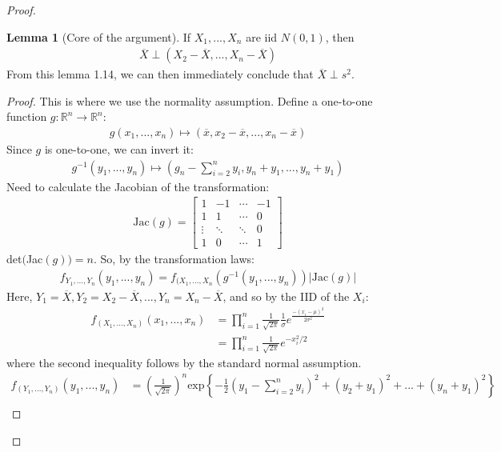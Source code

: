 \documentclass[11pt]{scrartcl}
\newcommand{\R}[0]{\mathbb{R}}
\theoremstyle{definition}
\newtheorem{lemma}[theorem]{Lemma}
\theoremstyle{remark}
\begin{document}
\begin{proof}
	\begin{lemma}[Core of the argument] If $X_1, ..., X_n$ are iid $N(0,1)$, then
	\begin{align}
		\overline{X} \perp (X_2 - \overline{X}, ..., X_n - \overline{X}) 
	\end{align}
	From this lemma 1.14, we can then immediately conclude that $\overline{X} \perp s^2$. 
	\end{lemma}
	\begin{proof} This is where we use the normality assumption. Define a one-to-one function $g: \R^n \rightarrow \R^n$: 
	\begin{align*}
		g(x_1, ..., x_n ) \mapsto (\overline{x}, x_2 - \overline{x}, ..., x_n - \overline{x})	
	\end{align*}
	Since $g$ is one-to-one, we can invert it: 
	\begin{align*}
	g^{-1}(y_1, ..., y_n) \mapsto \left(g_n - \sum_{i=2}^n y_i, y_n + y_1, ..., y_n + y_1  \right) 	
	\end{align*}
	Need to calculate the Jacobian  of the transformation: 
	\begin{align*}
		\text{Jac}(g) = \begin{bmatrix}
			1 & -1 & \cdots & -1 \\
			1 & 1  & \cdots & 0 \\
			\vdots & \ddots & \ddots & 0 \\
			1 & 0 & \cdots & 1 
		\end{bmatrix}	
	\end{align*}
	det$($Jac$(g)) = n$. So, by the transformation laws: 
	\begin{align*}
		f_{Y_1, ..., Y_n} (y_1 , ..., y_n) 	= f_{(X_1, ..., X_n} (g^{-1}(y_1, ..., y_n ) ) |\text{Jac}(g)|
	\end{align*}
	Here, $Y_1 = \overline{X}, Y_2= X_2 - \overline{X}, ..., Y_n  = X_n - \overline{X}$, and so by the IID of the $X_i$: 
	\begin{align*}
		f_{(X_1, ..., X_n)} (x_1, ..., x_n) & = \prod_{i=1}^n \frac{1}{\sqrt{2 \pi}}	 \frac{1}{\sigma} e^{\frac{-(x_i - \mu)^2}{2 \sigma^2}} \\	
		& = \prod_{i=1}^n \frac{1}{\sqrt{ 2 \pi}} e^{-x_i^2 / 2 } 		
	\end{align*}
	where the second inequality follows by the standard normal assumption. 
	\begin{align*}
		f_{(Y_1, ..., Y_n)}	(y_1, ..., y_n) & = \left( \frac{1}{\sqrt{2 \pi}}		\right)^n \text{exp} \left\{ 	-\frac{1}{2} \left(y_1 - \sum_{i=2}^n y_i \right)^2 + \left	( y_2 + y_1\right)^2 + ... + (y_n + y_1)^2 	\right\}  \\

\end{align*}
\end{proof}
\end{proof}
\end{document}
